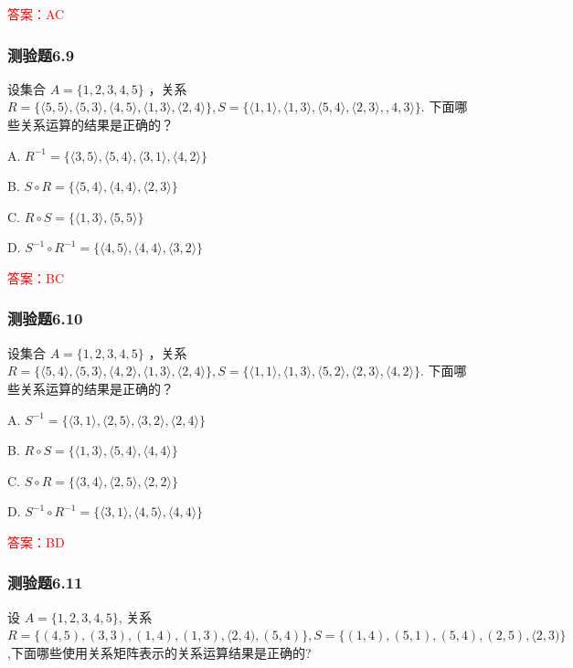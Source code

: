 \documentclass[UTF8, heading=true]{ctexart}
\begin{document}
\textcolor{red}{答案：AC}

\subsubsection{测验题6.9}

设集合 $A=\{1,2,3,4,5\}$ ，关系 $R=\{\langle 5,5\rangle,\langle 5,3\rangle,\langle 4,5\rangle,\langle 1,3\rangle,\langle 2,4\rangle\}, S=\{\langle 1,1\rangle,\langle 1,3\rangle,\langle 5,4\rangle,\langle 2,3\rangle,, 4,3\rangle\}$.
下面哪些关系运算的结果是正确的？

A. $ R^{-1}=\{\langle 3,5\rangle,\langle 5,4\rangle,\langle 3,1\rangle,\langle 4,2\rangle\} $

B. $S \circ R=\{\langle 5,4\rangle,\langle 4,4\rangle,\langle 2,3\rangle\} $

C. $ R \circ S=\{\langle 1,3\rangle,\langle 5,5\rangle\} $

D. $ S^{-1} \circ R^{-1}=\{\langle 4,5\rangle,\langle 4,4\rangle,\langle 3,2\rangle\}$

\textcolor{red}{答案：BC}


\subsubsection{测验题6.10}

设集合 $A=\{1,2,3,4,5\}$ ，关系 $R=\{\langle 5,4\rangle,\langle 5,3\rangle,\langle 4,2\rangle,\langle 1,3\rangle,\langle 2,4\rangle\}, S=\{\langle 1,1\rangle,\langle 1,3\rangle,\langle 5,2\rangle,\langle 2,3\rangle,\langle 4,2\rangle\}$.
下面哪些关系运算的结果是正确的？

A. $S^{-1}=\{\langle 3,1\rangle,\langle 2,5\rangle,\langle 3,2\rangle,\langle 2,4\rangle\}$

B. $R \circ S=\{\langle 1,3\rangle,\langle 5,4\rangle,\langle 4,4\rangle\}$

C. $ S \circ R=\{\langle 3,4\rangle,\langle 2,5\rangle,\langle 2,2\rangle\}$

D. $ S^{-1} \circ R^{-1}=\{\langle 3,1\rangle,\langle 4,5\rangle,\langle 4,4\rangle\}$

\textcolor{red}{答案：BD}



\subsubsection{测验题6.11}

设 $A=\{1,2,3,4,5\}$, 关系 $R=\{(4,5),(3,3),(1,4),(1,3),\langle 2,4),(5,4)\}, S=\{(1,4),(5,1),(5,4),(2,5),\langle 2,3)\}$,下面哪些使用关系矩阵表示的关系运算结果是正确的?
\end{document}
